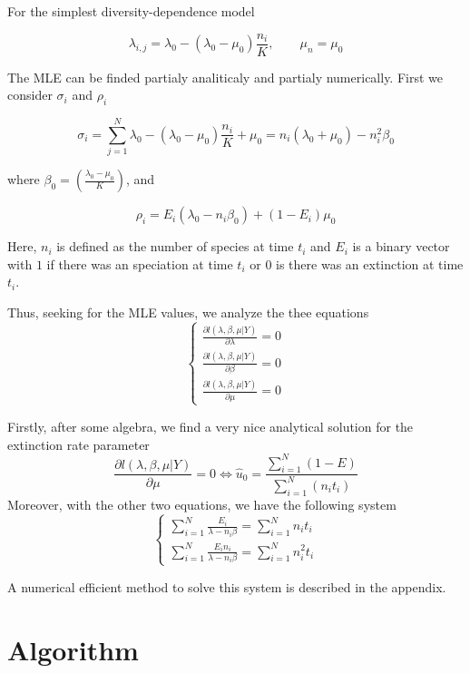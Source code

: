 \documentclass[]{article}
\begin{document}
For the simplest diversity-dependence model 

$$ \lambda_{i,j} = \lambda_0 - (\lambda_0 - \mu_0)\frac{n_i}{K}, \qquad \mu_n = \mu_0 $$ 

The MLE can be finded partialy analiticaly and partialy numerically. First we consider $\sigma_i$ and $\rho_i$ 

$$ \sigma_i  = \sum_{j=1}^{N}  \lambda_0 - (\lambda_0 - \mu_0)\frac{n_i}{K} + \mu_0 
 		 = n_i(\lambda_0 + \mu_0) - n_i^2\beta_0 $$

where $ \beta_0=\left(\frac{\lambda_0-\mu_0}{K}\right)$, and

$$\rho_i = E_i(\lambda_0 - n_i\beta_0)+(1-E_i)\mu_0$$

Here, $n_i$ is defined as the number of species at time $t_i$ and $E_i$ is a binary vector with $1$ if there was an speciation at time $t_i$ or $0$ is there was an extinction at time $t_i$. 

Thus, seeking for the MLE values, we analyze the thee equations 
$$\begin{cases} \frac{\partial l(\lambda,\beta,\mu | Y)}{\partial \lambda} = 0 \\
				\frac{\partial l(\lambda,\beta,\mu  | Y)}{\partial \beta} = 0 \\
				\frac{\partial l(\lambda,\beta,\mu  | Y)}{\partial \mu} = 0 
\end{cases} $$

Firstly, after some algebra, we find a very nice analytical solution for the extinction rate parameter
\begin{equation}
\label{mu}
 \frac{\partial l(\lambda,\beta,\mu | Y)}{\partial \mu} = 0  \Leftrightarrow \hat{u}_0 = \frac{\displaystyle\sum_{i=1}^N (1-E)}{\displaystyle\sum_{i=1}^N(n_it_i)} 
\end{equation}
Moreover, with the other two equations, we have the following system
$$\begin{cases} \displaystyle\sum_{i=1}^N \frac{E_i}{\lambda-n_i\beta} = \displaystyle\sum_{i=1}^N n_i t_i \\ \displaystyle\sum_{i=1}^N \frac{E_in_i}{\lambda-n_i\beta} = \displaystyle\sum_{i=1}^N n^2_i t_i \end{cases}$$

A numerical efficient method to solve this system is described in the appendix.

\section*{Algorithm}
\end{document}
